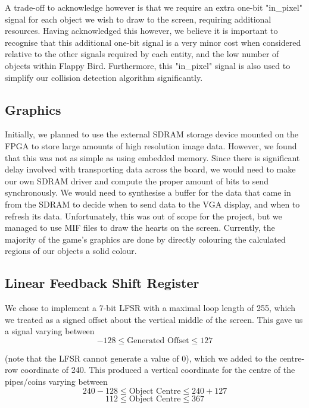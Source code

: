 \documentclass[conference]{IEEEtran}
\begin{document}
A trade-off to acknowledge however is that we require an extra one-bit "in\_pixel" signal for each object we wish to draw to the screen, requiring additional resources. Having acknowledged this however, we believe it is important to recognise that this additional one-bit signal is a very minor cost when considered relative to the other signals required by each entity, and the low number of objects within Flappy Bird. Furthermore, this "in\_pixel" signal is also used to simplify our collision detection algorithm significantly.

\subsection{Graphics}
Initially, we planned to use the external SDRAM storage device mounted on the FPGA to store large amounts of high resolution image data. However, we found that this was not as simple as using embedded memory. Since there is significant delay involved with transporting data across the board, we would need to make our own SDRAM driver and compute the proper amount of bits to send synchronously. We would need to synthesise a buffer for the data that came in from the SDRAM to decide when to send data to the VGA display, and when to refresh its data. Unfortunately, this was out of scope for the project, but we managed to use MIF files to draw the hearts on the screen. Currently, the majority of the game's graphics are done by directly colouring the calculated regions of our objects a solid colour.

\subsection{Linear Feedback Shift Register}
We chose to implement a 7-bit LFSR with a maximal loop length of 255, which we treated as a signed offset about the vertical middle of the screen. This gave us a signal varying between
\begin{equation}
    -128 \leq \text{Generated Offset} \leq 127
\end{equation}


(note that the LFSR cannot generate a value of 0), which we added to the centre-row coordinate of 240. This produced a vertical coordinate for the centre of the pipes/coins varying between
\begin{equation}
    240-128 \leq \text{Object Centre} \leq 240+127
\end{equation}
\begin{equation}
    112 \leq \text{Object Centre} \leq 367
\end{equation}
\end{document}

